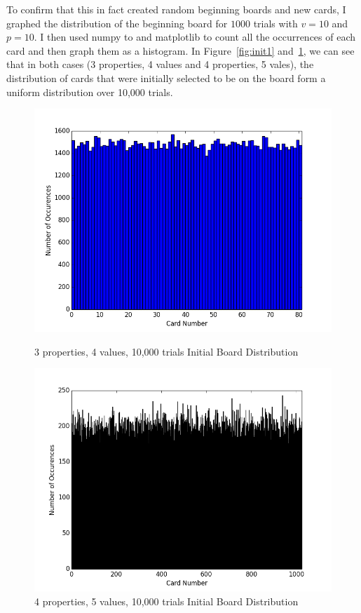 \documentclass[pageno]{jpaper}
\begin{document}
To confirm that this in fact created random beginning boards and new cards, I graphed the distribution of the beginning board for $1000$ trials with $v = 10$ and $p = 10$. I then used numpy to and matplotlib to count all the occurrences of each card and then graph them as a histogram. In Figure~\ref{fig:init1}  and~\ref{fig:init2}, we can see that in both cases (3 properties, 4 values and 4 properties, 5 vales), the distribution of cards that were initially selected to be on the board form a uniform distribution over 10,000 trials.

\begin{figure}[htbb]
\begin{minipage}[b]{0.5\linewidth}
\centering
\includegraphics[width=.75\linewidth]{3p4v10000Init.png}
\caption{3 properties, 4 values, 10,000 trials Initial Board Distribution}
\label{fig:init1}
\end{minipage}
\hspace{0.5cm}
\begin{minipage}[b]{0.5\linewidth}
\centering
\includegraphics[width=.75\linewidth]{4p5v10000Init.png}
\caption{4 properties, 5 values, 10,000 trials Initial Board Distribution}
\label{fig:init2}
\end{minipage}
\end{figure}
\end{document}
